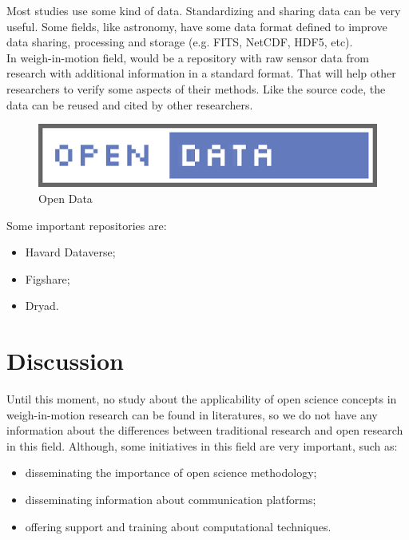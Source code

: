 \documentclass[a0,portrait]{a0poster}
\begin{document}
\begin{multicols}{2}
Most studies use some kind of data. Standardizing and sharing data can be very useful. Some fields, like astronomy, have some data format defined to improve data sharing, processing and storage  (e.g. FITS, NetCDF, HDF5, etc). \\

In weigh-in-motion field, would be a repository with raw sensor data from research with additional information in a standard format. That will help other researchers to verify some aspects of their methods. Like the source code, the data can be reused and cited by other researchers.\\

\begin{figure}
  \begin{center}
    \includegraphics[width=500px]{opendata.png}
  \end{center} 
  \caption{Open Data}
\end{figure}

Some important repositories are: 

\begin{itemize}
\item Havard Dataverse;
\item Figshare;
\item Dryad.
\end{itemize}



\section*{Discussion}

Until this moment, no study about the applicability of open science concepts in weigh-in-motion research can be found in literatures, so we do not have any information about the differences between traditional research and open research in this field. Although, some initiatives in this field are very important, such as:

\begin{itemize}
\item disseminating the importance of open science methodology;
\item disseminating information about communication platforms;
\item offering support and training about computational techniques.
\end{itemize}


\end{multicols}
\end{document}
